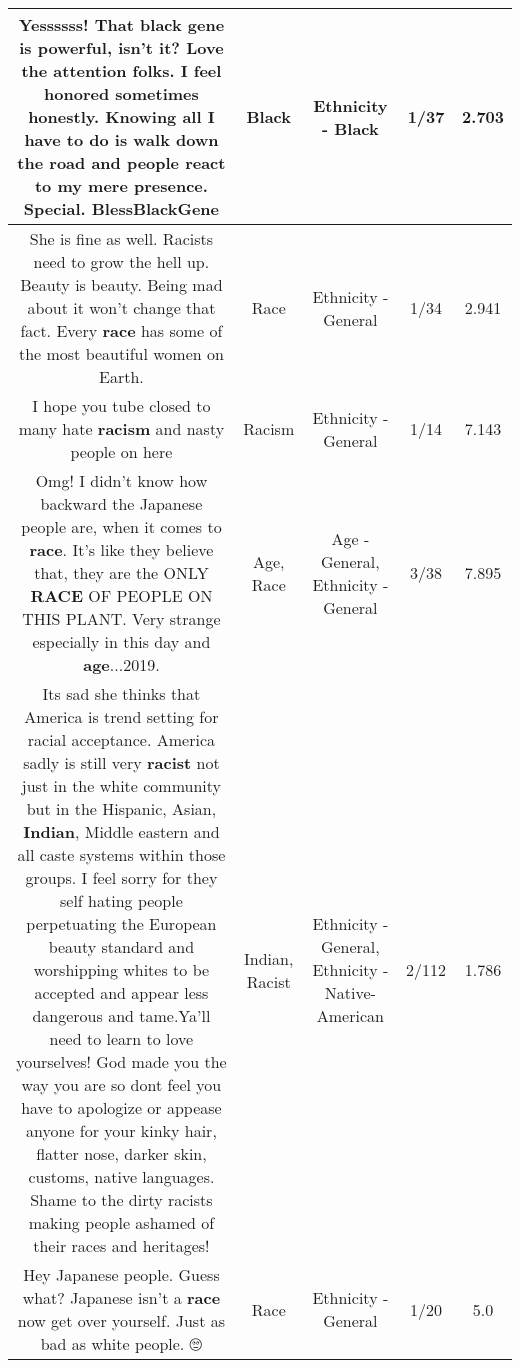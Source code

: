 \documentclass[11pt]{article}
\newlength\mylength
\begin{document}
\begin{center}
\begin{longtable}{|C{.65\mylength}|C{.30\mylength}|C{.12\mylength}|C{.12\mylength}|C{.12\mylength}|}
  \small Yessssss! That \textbf{black} gene is powerful, isn't it? Love the attention folks. I feel honored sometimes honestly. Knowing all I have to do is walk down the road and people react to my mere presence. Special. BlessBlackGene\normalsize   & Black & Ethnicity - Black & 1/37 & 2.703 \\  \hline
  \small She is fine as well. Racists need to grow the hell up. Beauty is beauty. Being mad about it won't change that fact. Every \textbf{race} has some of the most beautiful women on Earth.\normalsize   & Race & Ethnicity - General & 1/34 & 2.941 \\  \hline
  \small I hope you tube closed to many hate \textbf{racism} and nasty people on here\normalsize   & Racism & Ethnicity - General & 1/14 & 7.143 \\  \hline
  \small Omg! I didn't know how backward the Japanese people are,  when it comes to \textbf{race}. It's like they believe that, they are the ONLY \textbf{RACE} OF PEOPLE ON THIS PLANT. Very strange especially in this day and \textbf{age}...2019.\normalsize   & Age, Race & Age - General, Ethnicity - General & 3/38 & 7.895 \\  \hline
  \small Its sad she thinks that America is trend setting for racial acceptance. America sadly is still very \textbf{racist} not just in the white community but in the Hispanic, Asian, \textbf{Indian}, Middle eastern and all caste systems within those groups.  I feel sorry for they self hating people perpetuating the European beauty standard and worshipping whites to be accepted and appear less dangerous and tame.Ya'll need to learn to love yourselves! God made you the way you are so dont feel you have to apologize or appease anyone for your kinky hair, flatter nose, darker skin, customs, native languages. Shame to the dirty racists making people ashamed of their races and heritages!\normalsize   & Indian, Racist & Ethnicity - General, Ethnicity - Native-American & 2/112 & 1.786 \\  \hline
  \small Hey Japanese people. Guess what? Japanese isn't a \textbf{race} now get over yourself. Just as bad as white people. 🙄\normalsize   & Race & Ethnicity - General & 1/20 & 5.0 \\  \hline

\end{longtable}
\end{center}
\end{document}
